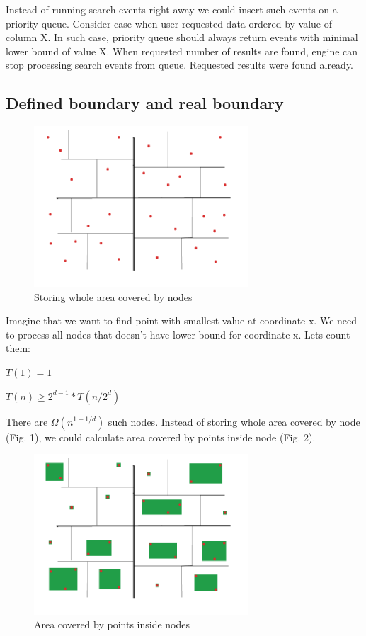 \documentclass{llncs}
\newcommand{\<}{\langle}
\renewcommand{\>}{\rangle}
\begin{document}
Instead of running search events right away we could insert such events on a priority queue. Consider case when user requested data ordered by value of column X. In such case, priority queue should always return events with minimal lower bound of value X. When requested number of results are found, engine can stop processing search events from queue. Requested results were found already.

\subsection{Defined boundary and real boundary}

\begin{figure}
\centering
  \includegraphics[width=8cm]{simple_boundary.png}%
  \caption{Storing whole area covered by nodes}
\end{figure}

Imagine that we want to find point with smallest value at coordinate x. We need to process all nodes
that doesn't have lower bound for coordinate x. Lets count them:
\bigskip

$T(1) = 1$

$T(n) \geq 2^{d-1} * T(n/2^{d})$

\bigskip

There are $\Omega (n^{1-1/d})$ such nodes. Instead of storing whole area covered by node (Fig. 1), we could calculate area covered by points inside node (Fig. 2).

\begin{figure}
\centering
  \includegraphics[width=8cm]{simple_boundary2.png}%
  \caption{Area covered by points inside nodes}
\end{figure}
\end{document}
